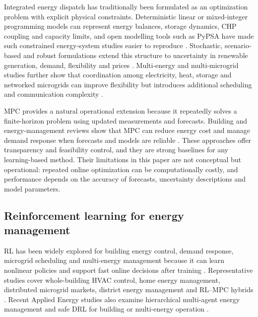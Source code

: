 \documentclass[preprint,12pt]{elsarticle}
\begin{document}
Integrated energy dispatch has traditionally been formulated as an optimization problem with explicit physical constraints. Deterministic linear or mixed-integer programming models can represent energy balances, storage dynamics, CHP coupling and capacity limits, and open modelling tools such as PyPSA have made such constrained energy-system studies easier to reproduce \cite{Brown2018PyPSA}. Stochastic, scenario-based and robust formulations extend this structure to uncertainty in renewable generation, demand, flexibility and prices \cite{Parisio2022ScenarioStochasticMicrogrid,Zhang2020StochasticHybridSystem,Zhou2023GISStochasticMultiMicrogrid}. Multi-energy and multi-microgrid studies further show that coordination among electricity, heat, storage and networked microgrids can improve flexibility but introduces additional scheduling and communication complexity \cite{Mancarella2019MultiEnergyInfrastructureReview,Du2021MultiMicrogridEMSReview,Ahmad2023MicrogridEMSReview,Mashayekh2020OptimizationFrameworksMicrogrid,Zhang2024CollaborativeMultiEnergyMicrogrid}.

MPC provides a natural operational extension because it repeatedly solves a finite-horizon problem using updated measurements and forecasts. Building and energy-management reviews show that MPC can reduce energy cost and manage demand response when forecasts and models are reliable \cite{Drgona2020MPCBuildingsReview,Afram2021BEMSReview}. These approaches offer transparency and feasibility control, and they are strong baselines for any learning-based method. Their limitations in this paper are not conceptual but operational: repeated online optimization can be computationally costly, and performance depends on the accuracy of forecasts, uncertainty descriptions and model parameters.

\subsection{Reinforcement learning for energy management}

RL has been widely explored for building energy control, demand response, microgrid scheduling and multi-energy management because it can learn nonlinear policies and support fast online decisions after training \cite{VazquezCanteli2019DemandResponseRL,VazquezCanteli2021RLEnergySystems,Zhang2020RLModernPowerEnergy,Antonopoulos2020AIDemandResponseReview}. Representative studies cover whole-building HVAC control, home energy management, distributed microgrid markets, district energy management and RL--MPC hybrids \cite{Nagy2020RLHVACDemandResponse,Lee2021DRLHomeEnergy,Ye2020MARLHomeEnergy,Gao2020DeepComfort,Liu2021MADRMicrogridMarket,Nagy2021DistrictEnergyDRL,Drgona2022RLMPCBuilding}. Recent Applied Energy studies also examine hierarchical multi-agent energy management and safe DRL for building or multi-energy operation \cite{Liu2023MultiAgentHierarchicalRL,Yang2023PhysicalInformedSafeRL,Li2025SafeDRLBuildingEnergy}.
\end{document}
